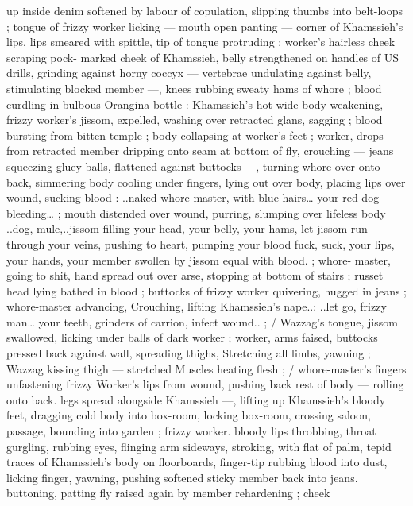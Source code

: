 up inside denim softened by labour of copulation, slipping thumbs 
into belt-loops ; tongue of frizzy worker licking --- mouth open 
panting --- corner of Khamssieh's lips, lips smeared with spittle, tip 
of tongue protruding ; worker's hairless cheek scraping pock- 
marked cheek of Khamssieh, belly strengthened on handles of US 
drills, grinding against horny coccyx --- vertebrae undulating against 
belly, stimulating blocked member ---, knees rubbing sweaty hams of 
whore ; blood curdling in bulbous Orangina bottle : Khamssieh's hot 
wide body weakening, frizzy worker's jissom, expelled, washing over 
retracted glans, sagging ; blood bursting from bitten temple ; body 
collapsing at worker's feet ; worker, drops from retracted member 
dripping onto seam at bottom of fly, crouching --- jeans squeezing 
gluey balls, flattened against buttocks ---, turning whore over onto 
back, simmering body cooling under fingers, lying out over body, 
placing lips over wound, sucking blood : {\gl}..naked whore-master, with 
blue hairs{\ldots} your red dog bleeding{\ldots}{\gr} ; mouth distended over wound, 
purring, slumping over lifeless body{\td} {\gl}..dog, mule,..jissom filling 
your head, your belly, your hams, let jissom run through your veins, 
pushing to heart, pumping your blood{\td} fuck, suck, your lips, your 
hands, your member swollen by jissom equal with blood.{\gr} ; whore- 
master, going to shit, hand spread out over arse, stopping at bottom 
of stairs ; russet head lying bathed in blood ; buttocks of frizzy 
worker quivering, hugged in jeans ; whore-master advancing, 
Crouching, lifting Khamssieh's nape..: {\gl}..let go, frizzy man{\ldots} your 
teeth, grinders of carrion, infect wound..{\gr} ; {\slash} Wazzag's tongue, 
jissom swallowed, licking under balls of dark worker ; worker, arms 
faised, buttocks pressed back against wall, spreading thighs, 
Stretching all limbs, yawning ; Wazzag kissing thigh --- stretched 
Muscles heating flesh ; {\slash} whore-master's fingers unfastening frizzy 
Worker's lips from wound, pushing back rest of body --- rolling onto 
back. legs spread alongside Khamssieh ---, lifting up Khamssieh's 
bloody feet, dragging cold body into box-room, locking box-room, 
crossing saloon, passage, bounding into garden ; frizzy worker. 
bloody lips throbbing, throat gurgling, rubbing eyes, flinging arm 
sideways, stroking, with flat of palm, tepid traces of Khamssieh's 
body on floorboards, finger-tip rubbing blood into dust, licking 
finger, yawning, pushing softened sticky member back into jeans. 
buttoning, patting fly raised again by member rehardening ; cheek 
